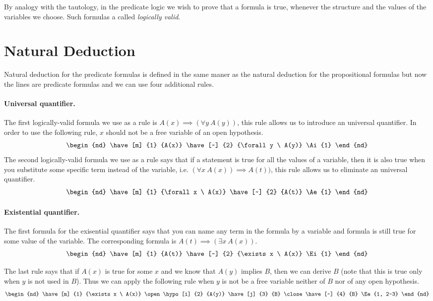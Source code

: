 By analogy with the tautology, in the predicate logic we wish to prove that a
formula is true, whenever the structure and the values of the variables we
choose. Such formulas a called \textit{logically valid}.

\section{Natural Deduction}
Natural deduction for the predicate formulas is defined in the same maner as
the natural deduction for the propositional formulas but now the lines are
predicate formulas and we can use four additional rules.

\paragraph{Universal quantifier.}
The first logically-valid formula we use as a rule is $A(x) \implies (\forall y
\ A(y))$, this rule allows us to introduce an universal quantifier.
In order to use the following rule, $x$ should not be a free variable of
an open hypothesis.
\[
  \begin{nd}
    \have [m] {1} {A(x)}
    \have [~] {2} {\forall y \  A(y)} \Ai{1}
  \end{nd}
\]
The second logically-valid formula we use as a rule says that if a statement is
true for all the values of a variable, then it is also true when you substitute
some specific term instead of the variable, i.e. $(\forall x \ A(x)) \implies
A(t))$, this rule allows us to eliminate an universal quantifier.
\[
  \begin{nd}
    \have [m] {1} {\forall x \  A(x)}
    \have [~] {2} {A(t)} \Ae{1}
  \end{nd}
\]

\paragraph{Existential quantifier.}
The first formula for the exisential quantifier says that you can name any term
in the formula by a variable and formula is still true for some value of the
variable. The corresponding formula is $A(t) \implies (\exists x \ A(x))$.
\[
  \begin{nd}
    \have [m] {1} {A(t)}
    \have [~] {2} {\exists x \ A(x)} \Ei{1}
  \end{nd}
\]

The last rule says that if $A(x)$ is true for some $x$ and we know that $A(y)$
implies $B$, then we can derive $B$ (note that this is true only when
$y$ is not used in $B$). Thus we can apply the following rule when $y$ is not
be a free variable neither of $B$ nor of any open hypothesis.
\[
  \begin{nd}
    \have [m] {1} {\exists x \ A(x)}
    \open
      \hypo [i] {2} {A(y)}
      \have[j] {3} {B}
    \close
    \have [~] {4} {B} \Ee{1, 2-3}
  \end{nd}
\]
